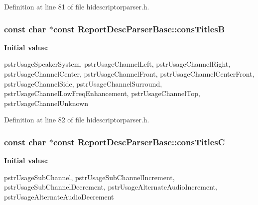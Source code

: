\-Definition at line 81 of file hidescriptorparser.\-h.

\hypertarget{class_report_desc_parser_base_a0c406d39f05eaa4f708af495c5d20bbb}{
\subsubsection[{cons\-Titles\-B}]{\setlength{\rightskip}{0pt plus 5cm}const char $\ast$const {\bf \-Report\-Desc\-Parser\-Base\-::cons\-Titles\-B}}}\label{class_report_desc_parser_base_a0c406d39f05eaa4f708af495c5d20bbb}
{\bfseries \-Initial value\-:}
\begin{DoxyCode}
 {
        pstrUsageSpeakerSystem,
        pstrUsageChannelLeft,
        pstrUsageChannelRight,
        pstrUsageChannelCenter,
        pstrUsageChannelFront,
        pstrUsageChannelCenterFront,
        pstrUsageChannelSide,
        pstrUsageChannelSurround,
        pstrUsageChannelLowFreqEnhancement,
        pstrUsageChannelTop,
        pstrUsageChannelUnknown
}
\end{DoxyCode}


\-Definition at line 82 of file hidescriptorparser.\-h.

\hypertarget{class_report_desc_parser_base_a149498f082b56537f6958f35cdf72485}{
\subsubsection[{cons\-Titles\-C}]{\setlength{\rightskip}{0pt plus 5cm}const char $\ast$const {\bf \-Report\-Desc\-Parser\-Base\-::cons\-Titles\-C}}}\label{class_report_desc_parser_base_a149498f082b56537f6958f35cdf72485}
{\bfseries \-Initial value\-:}
\begin{DoxyCode}
 {
        pstrUsageSubChannel,
        pstrUsageSubChannelIncrement,
        pstrUsageSubChannelDecrement,
        pstrUsageAlternateAudioIncrement,
        pstrUsageAlternateAudioDecrement
}
\end{DoxyCode}


